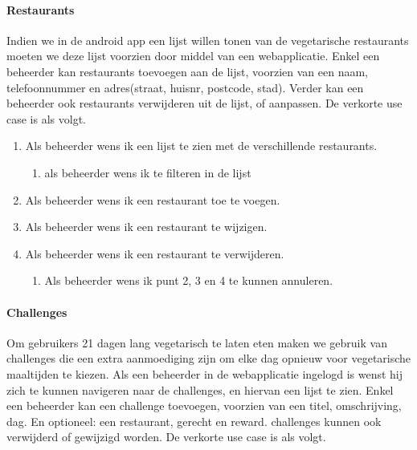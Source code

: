 \paragraph{Restaurants}

Indien we in de android app een lijst willen tonen van de vegetarische restaurants moeten we deze
lijst voorzien door middel van een webapplicatie. Enkel een beheerder kan restaurants toevoegen 
aan de lijst, voorzien van een naam, telefoonnummer en adres(straat, huisnr, postcode, stad). 
Verder kan een beheerder ook restaurants verwijderen uit de lijst, of aanpassen. 
De verkorte use case is als volgt.

\begin{enumerate}
	\item Als beheerder wens ik een lijst te zien met de verschillende restaurants.
	\begin{enumerate}
		\item als beheerder wens ik te filteren in de lijst
	\end{enumerate}
	\item Als beheerder wens ik een restaurant toe te voegen.
	\item Als beheerder wens ik een restaurant te wijzigen.
	\item Als beheerder wens ik een restaurant te verwijderen.
	\begin{enumerate}
		\item Als beheerder wens ik punt 2, 3 en 4 te kunnen annuleren.
	\end{enumerate}
\end{enumerate}

\paragraph{Challenges}

Om gebruikers 21 dagen lang vegetarisch te laten eten maken we gebruik van challenges die een
extra aanmoediging zijn om elke dag opnieuw voor vegetarische maaltijden te kiezen. Als een 
beheerder in de webapplicatie ingelogd is wenst hij zich te kunnen navigeren naar de 
challenges, en hiervan een lijst te zien. Enkel een beheerder kan een challenge toevoegen,
voorzien van een titel, omschrijving, dag. En optioneel: een restaurant, gerecht en reward.
challenges kunnen ook verwijderd of gewijzigd worden.
De verkorte use case is als volgt.


